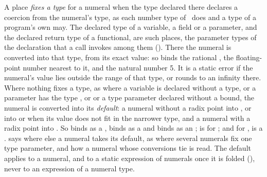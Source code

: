 A place \emph{fixes a type} for a numeral when the type declared there declares
a coercion from the numeral's type, as each number type of \library\ does and a
type of a program's own may.
The declared type of a variable, a field or a parameter, and the declared
return type of a functional, are such places, the parameter types of the
declaration that a call invokes among them ().
There the numeral is converted into that type, from its exact value:
so  binds the rational ,
 the floating-point number nearest to it, and
 the natural number 5.
It is a static error if the numeral's value lies outside the range of that
type, or rounds to an infinity there.
Where nothing fixes a type, as where a variable is declared without a type, or
a parameter has the type ,  or  or a type
parameter declared without a bound, the numeral is converted into its
\emph{default}: a numeral without a radix point into , or into
 or  when its value does not fit in the
narrower type, and a numeral with a radix point into .
So  binds  as a ,
 binds  as a  and
 binds  as an ;
 is  for ;
and for ,
 is a .
 says where else a numeral takes its default, as where
several numerals fix one type parameter, and how a numeral whose conversions
tie is read.
The default applies to a numeral, and to a static expression of numerals once
it is folded (), never to an expression of a numeral type.

